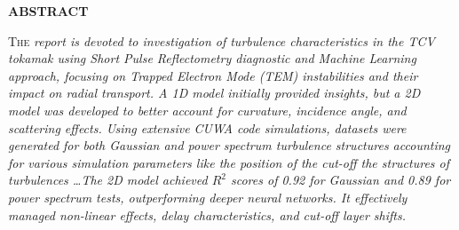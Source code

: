 \documentclass[11pt,a4paper,openany]{report}
\begin{document}
\begin{titlepage}
\begin{center}

    \end{center}

\end{titlepage}

\newpage

\renewcommand{\contentsname}{TABLE OF CONTENTS} %

\begin{multicols}{2}
    \renewcommand{\baselinestretch}{1.7}\normalsize %
    {\small \tableofcontents} %



    \renewcommand{\baselinestretch}{1.0}\normalsize

\end{multicols}
\newpage


\begin{center}
    \textbf{ABSTRACT}
\end{center}
\fontsize{9}{10}\selectfont

\lettrine[loversize=.30,findent=.21em,nindent=2.5pt]{\color{black} T}{he} \emph{ report is devoted
    to investigation of turbulence characteristics in the TCV tokamak using Short Pulse Reflectometry diagnostic and Machine Learning approach, focusing on Trapped Electron Mode (TEM) instabilities and their impact on radial transport. A 1D model initially provided insights, but a 2D model was developed to better account for curvature, incidence angle, and scattering effects. Using extensive CUWA code simulations, datasets were generated for both Gaussian and power spectrum turbulence structures accounting for various simulation parameters like the position of the cut-off the structures of turbulences \dots The 2D model achieved $R^2$ scores of 0.92 for Gaussian and 0.89 for power spectrum tests, outperforming deeper neural networks. It effectively managed non-linear effects, delay characteristics, and cut-off layer shifts.}
\fontsize{10}{10}\selectfont
\end{document}
